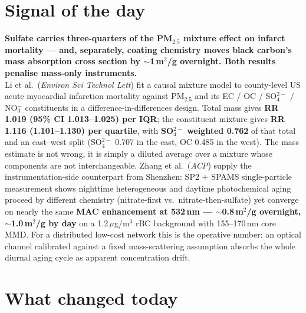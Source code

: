 \documentclass[10pt]{article}
\begin{document}
\vspace{6mm}

\section*{\sffamily\bfseries\color{Deep}Signal of the day}
\vspace{-1.5mm}{\color{Amber}\rule{\linewidth}{1.1pt}}\vspace{2.5mm}

\begin{keybox}
{\sffamily\bfseries\small\color{Deep}Sulfate carries three-quarters of the PM$_{2.5}$
mixture effect on infarct mortality --- and, separately, coating chemistry moves black
carbon's mass absorption cross section by $\sim$1\,m$^2$/g overnight. Both results
penalise mass-only instruments.}\\[1.4mm]
\footnotesize
Li et al.\ (\textit{Environ Sci Technol Lett}) fit a causal mixture model to county-level
US acute myocardial infarction mortality against PM$_{2.5}$ and its EC / OC / SO$_4^{2-}$
/ NO$_3^-$ constituents in a difference-in-differences design. Total mass gives
\textbf{RR 1.019 (95\% CI 1.013--1.025) per IQR}; the constituent mixture gives
\textbf{RR 1.116 (1.101--1.130) per quartile}, with \textbf{SO$_4^{2-}$ weighted 0.762} of
that total and an east--west split (SO$_4^{2-}$ 0.707 in the east, OC 0.485 in the west).
The mass estimate is not wrong, it is simply a diluted average over a mixture whose
components are not interchangeable. Zhang et al.\ (\textit{ACP}) supply the
instrumentation-side counterpart from Shenzhen: SP2 + SPAMS single-particle measurement
shows nighttime heterogeneous and daytime photochemical aging proceed by different
chemistry (nitrate-first vs.\ nitrate-then-sulfate) yet converge on nearly the same
\textbf{MAC enhancement at 532\,nm --- $\sim$0.8\,m$^2$/g overnight, $\sim$1.0\,m$^2$/g
by day} on a 1.2\,$\mu$g/m$^3$ rBC background with 155--170\,nm core MMD. For a
distributed low-cost network this is the operative number: an optical channel calibrated
against a fixed mass-scattering assumption absorbs the whole diurnal aging cycle as
apparent concentration drift.
\end{keybox}

\vspace{3mm}

\section*{\sffamily\bfseries\color{Deep}What changed today}
\vspace{-1.5mm}{\color{Amber}\rule{\linewidth}{1.1pt}}\vspace{2.5mm}
\end{document}

